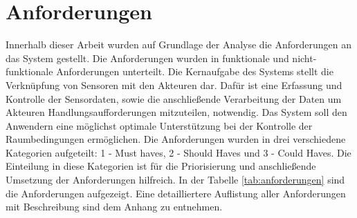 \section{Anforderungen}
Innerhalb dieser Arbeit wurden auf Grundlage der Analyse die Anforderungen an das System gestellt. Die Anforderungen wurden in funktionale und nicht-funktionale Anforderungen unterteilt. Die Kernaufgabe des Systems stellt die Verknüpfung von Sensoren mit den Akteuren dar. Dafür ist eine Erfassung und Kontrolle der Sensordaten, sowie die anschließende Verarbeitung der Daten um Akteuren Handlungsaufforderungen mitzuteilen, notwendig. Das System soll den Anwendern eine möglichst optimale Unterstützung bei der Kontrolle der Raumbedingungen ermöglichen. Die Anforderungen wurden in drei verschiedene Kategorien aufgeteilt: 1 - Must haves, 2 - Should Haves und 3 - Could Haves. Die Einteilung in diese Kategorien ist für die Priorisierung und anschließende Umsetzung der Anforderungen hilfreich. In der Tabelle \ref{tab:anforderungen} sind die Anforderungen aufgezeigt. Eine detailliertere Auflistung aller Anforderungen mit Beschreibung sind dem Anhang zu entnehmen.\\

